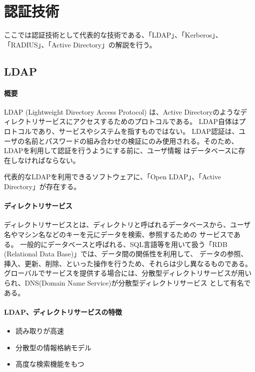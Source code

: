 \documentclass[11pt,a4j,titlepage]{jreport}
\begin{document}
\chapter{認証技術}\label{Authentication}
ここでは認証技術として代表的な技術である、「LDAP」、「Kerberos」、「RADIUS」、「Active Directory」の解説を行う。

\section{LDAP}
\subsubsection*{概要}
LDAP (Lightweight Directory Access Protocol) \cite{RFC4511}は、Active Directoryのようなディレクトリサービスにアクセスするためのプロトコルである。
LDAP自体はプロトコルであり、サービスやシステムを指すものではない。
LDAP認証は、ユーザの名前とパスワードの組み合わせの検証にのみ使用される。そのため、LDAPを利用して認証を行うようにする前に、ユーザ情報
はデータベースに存在しなければならない。

代表的なLDAPを利用できるソフトウェアに、「Open LDAP」、「Active Directory」が存在する。
\subsubsection*{ディレクトリサービス}
ディレクトリサービスとは、ディレクトリと呼ばれるデータベースから、ユーザ名やマシン名などのキーを元にデータを検索、参照するための
サービスである。
一般的にデータベースと呼ばれる、SQL言語等を用いて扱う「RDB (Relational Data Base)」では、データ間の関係性を利用して、
データの参照、挿入、更新、削除、といった操作を行うため、それらは少し異なるものである。
グローバルでサービスを提供する場合には、分散型ディレクトリサービスが用いられ、DNS(Domain Name Service)が分散型ディレクトリサービス
として有名である。

\subsubsection*{LDAP、ディレクトリサービスの特徴}

\begin{itemize}
    \item 読み取りが高速
    \item 分散型の情報格納モデル
    \item 高度な検索機能をもつ
\end{itemize}
\end{document}
